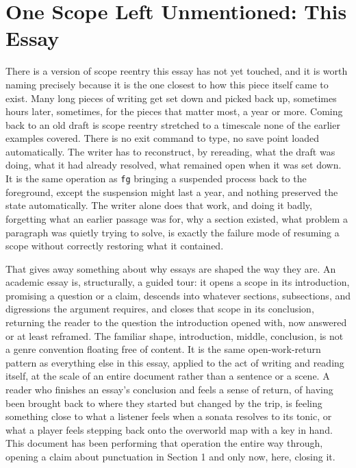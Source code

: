 \documentclass[11pt]{article}
\begin{document}
\section{One Scope Left Unmentioned: This Essay}

There is a version of scope reentry this essay has not yet touched, and it is worth naming precisely because it is the one closest to how this piece itself came to exist. Many long pieces of writing get set down and picked back up, sometimes hours later, sometimes, for the pieces that matter most, a year or more. Coming back to an old draft is scope reentry stretched to a timescale none of the earlier examples covered. There is no exit command to type, no save point loaded automatically. The writer has to reconstruct, by rereading, what the draft was doing, what it had already resolved, what remained open when it was set down. It is the same operation as \texttt{fg} bringing a suspended process back to the foreground, except the suspension might last a year, and nothing preserved the state automatically. The writer alone does that work, and doing it badly, forgetting what an earlier passage was for, why a section existed, what problem a paragraph was quietly trying to solve, is exactly the failure mode of resuming a scope without correctly restoring what it contained.

That gives away something about why essays are shaped the way they are. An academic essay is, structurally, a guided tour: it opens a scope in its introduction, promising a question or a claim, descends into whatever sections, subsections, and digressions the argument requires, and closes that scope in its conclusion, returning the reader to the question the introduction opened with, now answered or at least reframed. The familiar shape, introduction, middle, conclusion, is not a genre convention floating free of content. It is the same open-work-return pattern as everything else in this essay, applied to the act of writing and reading itself, at the scale of an entire document rather than a sentence or a scene. A reader who finishes an essay's conclusion and feels a sense of return, of having been brought back to where they started but changed by the trip, is feeling something close to what a listener feels when a sonata resolves to its tonic, or what a player feels stepping back onto the overworld map with a key in hand. This document has been performing that operation the entire way through, opening a claim about punctuation in Section 1 and only now, here, closing it.
\end{document}
